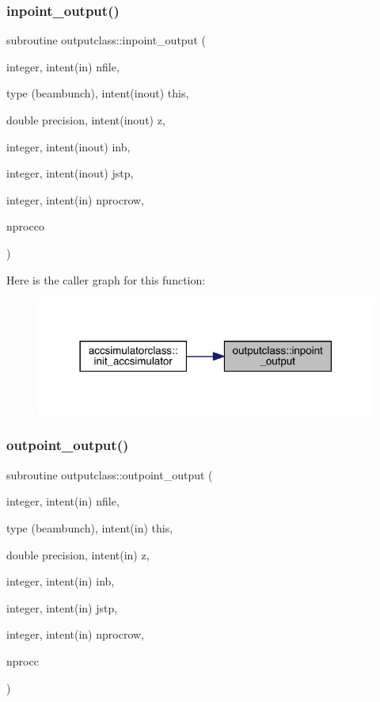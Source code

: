 \subsubsection{\texorpdfstring{inpoint\_output()}{inpoint\_output()}}
{\footnotesize\ttfamily subroutine outputclass\+::inpoint\+\_\+output (\begin{DoxyParamCaption}\item[{integer, intent(in)}]{nfile,  }\item[{type (beambunch), intent(inout)}]{this,  }\item[{double precision, intent(inout)}]{z,  }\item[{integer, intent(inout)}]{inb,  }\item[{integer, intent(inout)}]{jstp,  }\item[{integer, intent(in)}]{nprocrow,  }\item[{}]{nprocco }\end{DoxyParamCaption})}

Here is the caller graph for this function\+:\nopagebreak
\begin{figure}[H]
\begin{center}
\leavevmode
\includegraphics[width=318pt]{namespaceoutputclass_a9fcc4b33aa3d9bee76ef32e6708293b1_icgraph}
\end{center}
\end{figure}
\mbox{\label{namespaceoutputclass_a14e60e5c44149548fa7843b51c625969}} 
\subsubsection{\texorpdfstring{outpoint\_output()}{outpoint\_output()}}
{\footnotesize\ttfamily subroutine outputclass\+::outpoint\+\_\+output (\begin{DoxyParamCaption}\item[{integer, intent(in)}]{nfile,  }\item[{type (beambunch), intent(in)}]{this,  }\item[{double precision, intent(in)}]{z,  }\item[{integer, intent(in)}]{inb,  }\item[{integer, intent(in)}]{jstp,  }\item[{integer, intent(in)}]{nprocrow,  }\item[{}]{nprocc }\end{DoxyParamCaption})}

